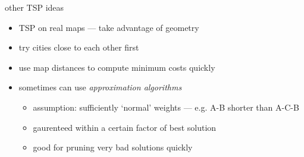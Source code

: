 \begin{frame}{other TSP ideas}
\begin{itemize}
\item TSP on real maps --- take advantage of geometry
\item try cities close to each other first
\item use map distances to compute minimum costs quickly
\item sometimes can use \textit{approximation algorithms}
    \begin{itemize}
    \item assumption: sufficiently `normal' weights --- e.g. A-B shorter than A-C-B
    \item gaurenteed within a certain factor of best solution
    \item good for pruning very bad solutions quickly
    \end{itemize}
\end{itemize}
\end{frame}
